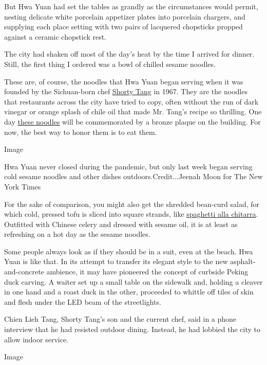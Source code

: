 But Hwa Yuan had set the tables as grandly as the circumstances would
permit, nesting delicate white porcelain appetizer plates into porcelain
chargers, and supplying each place setting with two pairs of lacquered
chopsticks propped against a ceramic chopstick rest.

The city had shaken off most of the day's heat by the time I arrived for
dinner. Still, the first thing I ordered was a bowl of chilled sesame
noodles.

These are, of course, the noodles that Hwa Yuan began serving when it
was founded by the Sichuan-born chef
\href{https://dinersjournal.blogs.nytimes3xbfgragh.onion/2010/09/30/shorty-tang-sesame-noodle-king-isremembered/}{Shorty
Tang} in 1967. They are the noodles that restaurants across the city
have tried to copy, often without the run of dark vinegar or orange
splash of chile oil that made Mr. Tang's recipe so thrilling. One day
\href{https://cooking.nytimes3xbfgragh.onion/recipes/9558-takeout-style-sesame-noodles}{these
noodles} will be commemorated by a bronze plaque on the building. For
now, the best way to honor them is to eat them.

Image

Hwa Yuan never closed during the pandemic, but only last week began
serving cold sesame noodles and other dishes outdoors.Credit...Jeenah
Moon for The New York Times

For the sake of comparison, you might also get the shredded bean-curd
salad, for which cold, pressed tofu is sliced into square strands, like
\href{https://www.nytimes3xbfgragh.onion/2004/05/26/dining/a-guitar-that-makes-beautiful-pasta.html}{spaghetti
alla chitarra}. Outfitted with Chinese celery and dressed with sesame
oil, it is at least as refreshing on a hot day as the sesame noodles.

Some people always look as if they should be in a suit, even at the
beach. Hwa Yuan is like that. In its attempt to transfer its elegant
style to the new asphalt-and-concrete ambience, it may have pioneered
the concept of curbside Peking duck carving. A waiter set up a small
table on the sidewalk and, holding a cleaver in one hand and a roast
duck in the other, proceeded to whittle off tiles of skin and flesh
under the LED beam of the streetlights.

Chien Lieh Tang, Shorty Tang's son and the current chef, said in a phone
interview that he had resisted outdoor dining. Instead, he had lobbied
the city to allow indoor service.

Image


